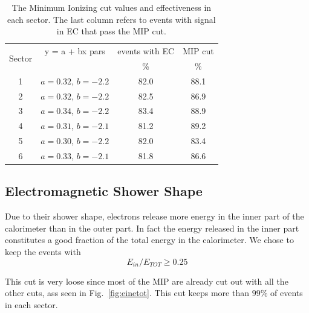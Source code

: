 \begin{table}[b]
\label{tab:EoEi}
	\begin{center}
		\begin{tabular}{c | c | c | c}
			\hline 
			\multirow{2}{*}{Sector} 
					& y = a + bx pars & events with EC & MIP cut \\
					&   & \% & \% \\
			\hline
			1    & $a=0.32$, $b=-2.2$ & 82.0 & 88.1 \\
			2    & $a=0.32$, $b=-2.2$ & 82.5 & 86.9 \\
			3    & $a=0.34$, $b=-2.2$ & 83.4 & 88.9 \\
			4    & $a=0.31$, $b=-2.1$ & 81.2 & 89.2 \\
			5    & $a=0.30$, $b=-2.2$ & 82.0 & 83.4 \\
			6    & $a=0.33$, $b=-2.1$ & 81.8 & 86.6 \\
			\hline
		\end{tabular}
		\caption{The Minimum Ionizing cut values and effectiveness in each sector.
					The last column refers to events with signal in EC that pass the MIP cut.}	
	\end{center}
\end{table}





\clearpage\newpage
\subsection{Electromagnetic Shower Shape}
Due to their shower shape, electrons release more energy in 
the inner part of the calorimeter than in the outer part. In
fact the energy released in the inner part constitutes a good
fraction of the total energy in the calorimeter.
We chose to keep the events with $$E_{in}/E_{TOT} \geq 0.25$$

This cut is very loose since most of the MIP are already cut
out with all the other cuts, ass seen in Fig.~\ref{fig:einetot}.
This cut keeps more than $99\%$ of events in each sector.



